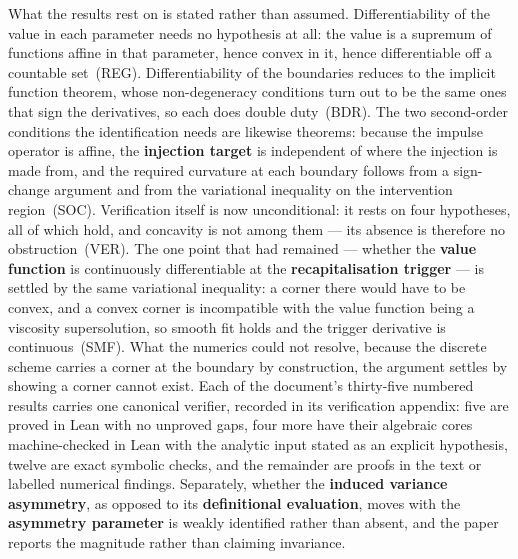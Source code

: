 \documentclass[11pt]{article}
\begin{document}
What the results rest on is stated rather than assumed. Differentiability
of the value in each parameter needs no hypothesis at all: the value is a
supremum of functions affine in that parameter, hence convex in it, hence
differentiable off a countable set~(REG). Differentiability of the
boundaries reduces to the implicit function theorem, whose non-degeneracy
conditions turn out to be the same ones that sign the derivatives, so each
does double duty~(BDR). The two second-order conditions the identification
needs are likewise theorems: because the impulse operator is affine, the
\textbf{injection target} is independent of where the injection is made from, and
the required curvature at each boundary follows from a sign-change
argument and from the variational inequality on the intervention
region~(SOC). Verification itself is now unconditional: it rests on four
hypotheses, all of which hold, and concavity is not among them --- its
absence is therefore no obstruction~(VER). The one point that had
remained --- whether the \textbf{value function} is continuously
differentiable at the \textbf{recapitalisation trigger} --- is settled by
the same variational inequality: a corner there would have to be convex,
and a convex corner is incompatible with the value function being a
viscosity supersolution, so smooth fit holds and the trigger derivative
is continuous~(SMF). What the numerics could not resolve, because the
discrete scheme carries a corner at the boundary by construction, the
argument settles by showing a corner cannot exist. Each of the
document's thirty-five numbered results carries one canonical verifier,
recorded in its verification appendix: five are proved in Lean with no
unproved gaps, four more have their algebraic cores machine-checked in
Lean with the analytic input stated as an explicit hypothesis, twelve
are exact symbolic checks, and the remainder are proofs in the text or
labelled numerical findings. Separately, whether the
\textbf{induced variance asymmetry}, as opposed to its \textbf{definitional evaluation},
moves with the \textbf{asymmetry parameter} is weakly identified rather than
absent, and the paper reports the magnitude rather than claiming
invariance.
\end{document}

